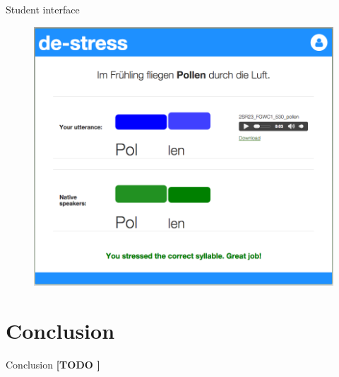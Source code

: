 \documentclass[xcolor={dvipsnames}]{beamer}
\newcommand{\TODO}[1]{{\color{red}\textbf{[TODO #1]}}}
\begin{document}
		\begin{frame}{Student interface}
		\begin{figure}
		\includegraphics[height=.85\textheight]{../img/screenshots/StudentInterface-userIcon}
		\end{figure}
		\end{frame}
		
\section{Conclusion}
		\begin{frame}{Conclusion}
		\TODO{}
		\end{frame}
\end{document}
